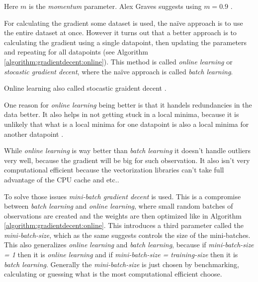 Here $m$ is the \textit{momentum} parameter. Alex Graves suggests using $m = 0.9$ \cite{alexgraves}.

For calculating the gradient some dataset is used, the naïve approach is to use the entire dataset at once. However it turns out that a better approach is to calculating the gradient using a single datapoint, then updating the parameters and repeating for all datapoints (see Algorithm \ref{algorithm:gradientdecent:online}). This method is called \textit{online learning} or \textit{stocastic gradient decent}, where the naïve approach is called \textit{batch learning}.

\begin{algorithm}[h]
 \DontPrintSemicolon
 \caption{Online learning also called stocastic graident decent \cite{alexgraves}.}
 \label{algorithm:gradientdecent:online}
\end{algorithm}

One reason for \textit{online learning} being better is that it handels redundancies in the data better. It also helps in not getting stuck in a local minima, because it is unlikely that what is a local minima for one datapoint is also a local minima for another datapoint \cite{bishop}.

While \textit{online learning} is way better than \textit{batch learning} it doesn't handle outliers very well, because the gradient will be big for such observation. It also isn't very computational efficient because the vectorization libraries can't take full advantage of the CPU cache and etc..

To solve those issues \textit{mini-batch gradient decent} is used. This is a compromise between \textit{batch learning} and \textit{online learning}, where small random batches of observations are created and the weights are then optimized like in Algorithm \ref{algorithm:gradientdecent:online}. This introduces a third parameter called the \textit{mini-batch-size}, which as the same suggests controls the size of the mini-batches. This also generalizes \textit{online learning} and \textit{batch learning}, because if \textit{mini-batch-size = 1} then it is \textit{online learning} and if \textit{mini-batch-size = training-size} then it is \textit{batch learning}. Generally the \textit{mini-batch-size} is just chosen by benchmarking, calculating or guessing what is the most computational efficient choose.

